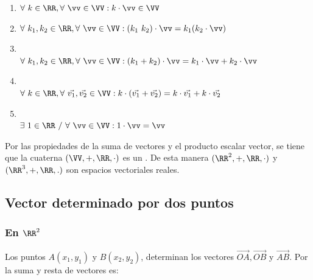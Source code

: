 \begin{enumerate}
    \item {} $\forall\ k \in\RR, \forall\ \vv \in\VV: k \cdot \vv \in\VV$
    
    \item {} $\forall\ k_1, k_2 \in\RR, \forall\ \vv \in\VV: (k_1\ k_2) \cdot \vv = k_1 (k_2\cdot \vv)$
    
    \item {}\\
    $\forall\ k_1, k_2 \in \RR, \forall\ \vv \in\VV: (k_1 + k_2) \cdot \vv = k_1\cdot \vv + k_2\cdot \vv$
    
    \item {} \\
    $\forall\ k \in \RR, \forall\ \vec{v_1}, \vec{v_2} \in \VV: k \cdot (\vec{v_1} + \vec{v_2}) = k\cdot \vec{v_1} + k\cdot \vec{v_2}$
    
    \item {}\\ 
    $\exists\ 1 \in \RR\ /\ \forall\ \vv \in\VV: 1 \cdot \vv = \vv$
\end{enumerate}

Por las propiedades de la suma de vectores y el producto escalar vector, se tiene que la cuaterna $(\VV, +, \RR, \cdot)$ es un . De esta manera $(\RR^2, +, \RR, \cdot)$ y $(\RR^3, +, \RR, .)$ son
espacios vectoriales reales.




\subsection{Vector determinado por dos puntos}

\subsubsection* {En $\RR^2$}
Los puntos $A(x_1, y_1)$  y  $B(x_2, y_2)$, determinan los vectores $\vec{OA}, \vec{OB}$ y $\vec{AB}$. Por la suma y resta de vectores es:

